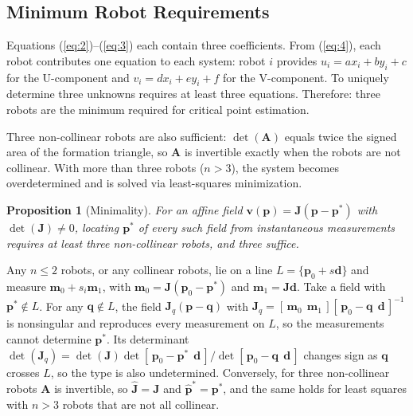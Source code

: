 \documentclass[lettersize,journal]{IEEEtran}
\newtheorem{proposition}{Proposition}
\begin{document}
\subsection{Minimum Robot Requirements}

Equations (\ref{eq:2})--(\ref{eq:3}) each contain three coefficients. From (\ref{eq:4}), each robot contributes one equation to each system: robot $i$ provides $u_i = ax_i + by_i + c$ for the U-component and $v_i = dx_i + ey_i + f$ for the V-component. To uniquely determine three unknowns requires at least three equations. Therefore: three robots are the minimum required for critical point estimation.


Three non-collinear robots are also sufficient: $\det(\mathbf{A})$ equals twice the signed area of the formation triangle, so $\mathbf{A}$ is invertible exactly when the robots are not collinear. With more than three robots ($n > 3$), the system becomes overdetermined and is solved via least-squares minimization.

\begin{proposition}[Minimality]\label{prop:min}
For an affine field $\mathbf{v}(\mathbf{p}) = \mathbf{J}(\mathbf{p}-\mathbf{p}^*)$ with $\det(\mathbf{J}) \neq 0$, locating $\mathbf{p}^*$ of every such field from instantaneous measurements requires at least three non-collinear robots, and three suffice.
\end{proposition}

\begin{IEEEproof}
Any $n \le 2$ robots, or any collinear robots, lie on a line $L = \{\mathbf{p}_0 + s\mathbf{d}\}$ and measure $\mathbf{m}_0 + s_i\mathbf{m}_1$, with $\mathbf{m}_0 = \mathbf{J}(\mathbf{p}_0 - \mathbf{p}^*)$ and $\mathbf{m}_1 = \mathbf{J}\mathbf{d}$. Take a field with $\mathbf{p}^* \notin L$. For any $\mathbf{q} \notin L$, the field $\mathbf{J}_q(\mathbf{p} - \mathbf{q})$ with $\mathbf{J}_q = [\,\mathbf{m}_0\ \ \mathbf{m}_1\,][\,\mathbf{p}_0 - \mathbf{q}\ \ \mathbf{d}\,]^{-1}$ is nonsingular and reproduces every measurement on $L$, so the measurements cannot determine $\mathbf{p}^*$. Its determinant $\det(\mathbf{J}_q) = \det(\mathbf{J})\det[\,\mathbf{p}_0 - \mathbf{p}^*\ \ \mathbf{d}\,]/\det[\,\mathbf{p}_0 - \mathbf{q}\ \ \mathbf{d}\,]$ changes sign as $\mathbf{q}$ crosses $L$, so the type is also undetermined. Conversely, for three non-collinear robots $\mathbf{A}$ is invertible, so $\hat{\mathbf{J}} = \mathbf{J}$ and $\hat{\mathbf{p}}^* = \mathbf{p}^*$, and the same holds for least squares with $n > 3$ robots that are not all collinear.
\end{IEEEproof}
\end{document}
